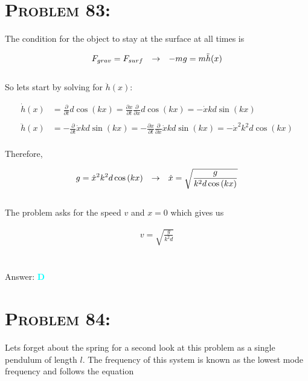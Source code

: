 \documentclass{article}
\begin{document}

\section{\textsc{Problem 83:}} The condition for the object to stay at the surface at all times is

\begin{gather}
F_{grav} = F_{surf} \hspace{.1in} \rightarrow \hspace{.1in} -mg = m\ddot{h}(x)\nonumber
\end{gather}
\\
So lets start by solving for $\ddot{h}(x)$:

\begin{align}
\dot{h}(x) &= \frac{\partial}{ \partial t} d \cos{(kx)} =  \frac{ \partial x}{ \partial t} \frac{\partial }{\partial x} d \cos{(kx)} = - \dot{x} k d  \sin{(kx)} \nonumber\\
\nonumber\\
%
\ddot{h}(x) &= - \frac{\partial}{ \partial t} \dot{x} k d  \sin{(kx)} = - \frac{ \partial x}{ \partial t} \frac{\partial }{\partial x} \dot{x} k d  \sin{(kx)}  = -\dot{x}^{2} k^{2} d \cos{(kx)}\nonumber
\end{align}
\\
Therefore,

\begin{gather}
g = \dot{x}^{2} k^{2} d  \cos{(kx)} \hspace{.1in} \rightarrow \hspace{.1in} \dot{x} = \sqrt{ \frac{ g }{  k^{2} d \cos{(kx)} } } \nonumber
\end{gather}
\\
The problem asks for the speed $v$ and $x = 0 $ which gives us

\begin{gather}
\boxed{v = \sqrt{ \frac{ g }{  k^{2} d } }} \nonumber
\end{gather}
\\\\
Answer: \textbf{\textcolor{cyan}D}\\


\section{\textsc{Problem 84:}} Lets forget about the spring for a second look at this problem as a single pendulum of length $l$. The frequency of this system is known as the lowest mode frequency and follows the equation
\end{document}
